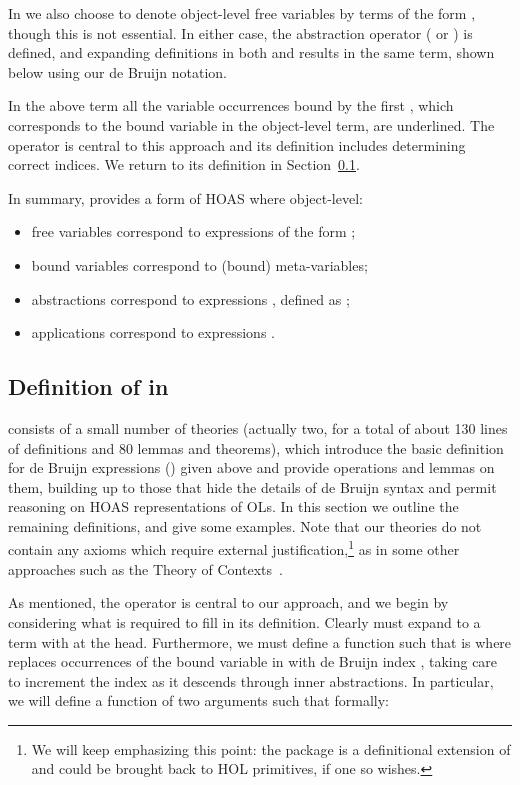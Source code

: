 \documentclass[final]{svjour3}
\begin{document}
In \hybrid we also choose to denote object-level free variables by terms
of the form , though this is not essential.
In either case, the abstraction operator ( or ) is
defined, and expanding definitions in both  and 
results in the same term, shown below using our de Bruijn notation.

In the above term all the variable occurrences bound by the first
, which corresponds to the bound variable  in the
object-level term, are underlined.  The  operator is
central to this approach and its definition includes determining
correct indices.  We return to its definition in
Section~\ref{defh}.

\smallskip
In summary, \hybrid provides a form of HOAS where object-level:
\begin{itemize}
\item free variables correspond to \hybrid expressions of the
form ;
\item bound variables correspond to (bound) meta-variables;
\item abstractions  correspond to
  expressions , defined as ;
\item  applications 
  correspond to expressions .
\end{itemize}


\subsection{Definition of \hybrid in \HOL}
\label{defh}

\hybrid consists of a small number of \HOL theories (actually two, for
a total of about 130 lines of definitions and 80 lemmas and theorems), which 
introduce the basic definition for de Bruijn expressions ()
given above and provide operations and lemmas on them, building up to
those that hide the details of de Bruijn syntax and permit reasoning
on HOAS representations of OLs.  In this
section we outline the remaining definitions, and give some examples.
Note that our \HOL theories do not contain any axioms which
require external justification,\footnote{We will keep emphasizing this point: the
    package is a definitional extension of \HOL and could be brought
    back to HOL primitives, if one so wishes.} as in some
other approaches such as the Theory of Contexts~\cite{HonsellMS01}.

As mentioned, the operator  is central to our approach, and we begin by
considering what is required to fill in its definition.  Clearly
 must expand to a term with  at the head.
Furthermore, we must define a function  such that 
is  where  replaces occurrences of the bound
variable in  with de Bruijn index , taking care to increment the
index as it descends through inner abstractions.  In particular, we
will define a function  of two arguments such that
formally:
\end{document}
